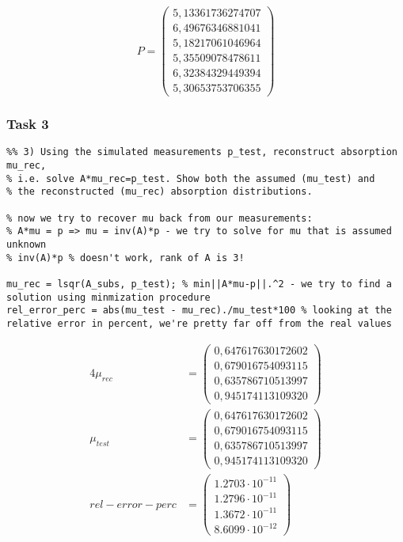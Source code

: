 \begin{equation}
    P = \left(\begin{array}{c}
    5,13361736274707\\6,49676346881041\\5,18217061046964\\5,35509078478611\\6,32384329449394\\5,30653753706355 \end{array}\right)
\end{equation}



\subsubsection*{Task 3}
\begin{lstlisting}
%% 3) Using the simulated measurements p_test, reconstruct absorption mu_rec,
% i.e. solve A*mu_rec=p_test. Show both the assumed (mu_test) and
% the reconstructed (mu_rec) absorption distributions.

% now we try to recover mu back from our measurements:
% A*mu = p => mu = inv(A)*p - we try to solve for mu that is assumed unknown
% inv(A)*p % doesn't work, rank of A is 3!

mu_rec = lsqr(A_subs, p_test); % min||A*mu-p||.^2 - we try to find a solution using minmization procedure
rel_error_perc = abs(mu_test - mu_rec)./mu_test*100 % looking at the relative error in percent, we're pretty far off from the real values
\end{lstlisting}

\begin{align*}{4}
    \mu_{rec}  &= \left(\begin{array}{c} 0,647617630172602\\0,679016754093115\\0,635786710513997\\0,945174113109320 \end{array}\right)\\
    \mu_{test} &= \left(\begin{array}{c} 0,647617630172602\\0,679016754093115\\0,635786710513997\\0,945174113109320 \end{array}\right)\\
    rel-error-perc &= \left(\begin{array}{c} 1.2703\cdot 10^{-11}\\ 1.2796\cdot 10^{-11}\\ 1.3672\cdot 10^{-11}\\ 8.6099\cdot 10^{-12} \end{array}\right)
\end{align*}


